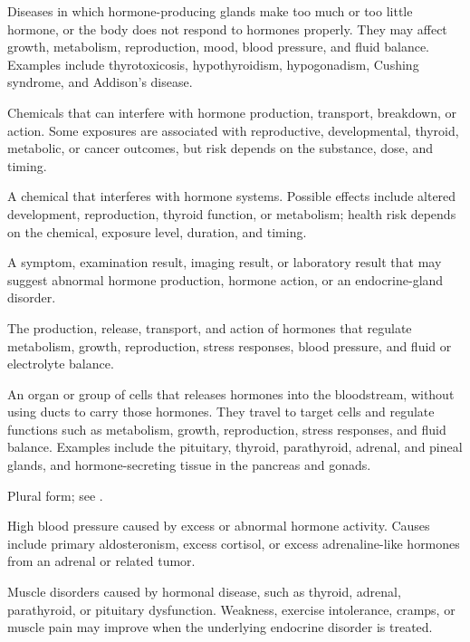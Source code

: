  Diseases in which hormone-producing glands make too much or too little hormone, or the body does not respond to hormones properly. They may affect growth, metabolism, reproduction, mood, blood pressure, and fluid balance. Examples include thyrotoxicosis, hypothyroidism, hypogonadism, Cushing syndrome, and Addison's disease.

 Chemicals that can interfere with hormone production, transport, breakdown, or action. Some exposures are associated with reproductive, developmental, thyroid, metabolic, or cancer outcomes, but risk depends on the substance, dose, and timing.

 A chemical that interferes with hormone systems. Possible effects include altered development, reproduction, thyroid function, or metabolism; health risk depends on the chemical, exposure level, duration, and timing.

 A symptom, examination result, imaging result, or laboratory result that may suggest abnormal hormone production, hormone action, or an endocrine-gland disorder.

 The production, release, transport, and action of hormones that regulate metabolism, growth, reproduction, stress responses, blood pressure, and fluid or electrolyte balance.

 An organ or group of cells that releases hormones into the bloodstream,
without using ducts to carry those hormones. They travel to target cells and regulate functions such
as metabolism, growth, reproduction, stress responses, and fluid balance. Examples include the
pituitary, thyroid, parathyroid, adrenal, and pineal glands, and hormone-secreting tissue in the
pancreas and gonads.

 Plural form; see .

 High blood pressure caused by excess or abnormal hormone activity. Causes include primary aldosteronism, excess cortisol, or excess adrenaline-like hormones from an adrenal or related tumor.

 Muscle disorders caused by hormonal disease, such as thyroid, adrenal, parathyroid, or pituitary dysfunction. Weakness, exercise intolerance, cramps, or muscle pain may improve when the underlying endocrine disorder is treated.


